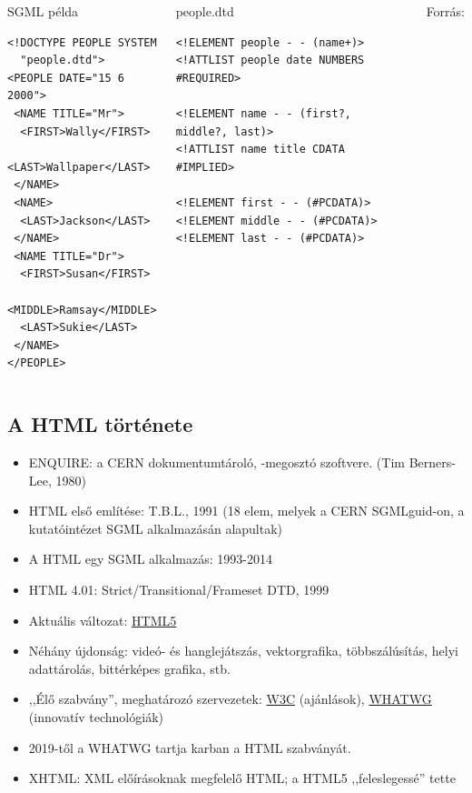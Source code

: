 \documentclass[usenames,dvipsnames,aspectratio=169]{beamer}
\newcommand{\hiv}[1]{{\color{hivatkozasszin}#1}}
\begin{document}
\begin{frame}[fragile]
  \scriptsize
  \begin{columns}[T]
    \begin{exampleblock}{SGML példa}
      \begin{verbatim}
<!DOCTYPE PEOPLE SYSTEM 
  "people.dtd">
<PEOPLE DATE="15 6 2000">
 <NAME TITLE="Mr">
  <FIRST>Wally</FIRST>
  <LAST>Wallpaper</LAST>
 </NAME>
 <NAME>
  <LAST>Jackson</LAST>
 </NAME>
 <NAME TITLE="Dr">
  <FIRST>Susan</FIRST>
  <MIDDLE>Ramsay</MIDDLE>
  <LAST>Sukie</LAST>
 </NAME>
</PEOPLE>
\end{verbatim}
    \end{exampleblock}
    \begin{exampleblock}{people.dtd}
      \begin{verbatim}
<!ELEMENT people - - (name+)>
<!ATTLIST people date NUMBERS #REQUIRED>

<!ELEMENT name - - (first?, middle?, last)>
<!ATTLIST name title CDATA #IMPLIED>

<!ELEMENT first - - (#PCDATA)>
<!ELEMENT middle - - (#PCDATA)>
<!ELEMENT last - - (#PCDATA)>
\end{verbatim}
    \end{exampleblock}
    \tiny
    Forrás: 
  \end{columns}
\end{frame}

\subsection{A HTML története}

\begin{frame}
  \begin{itemize}
    \item ENQUIRE: a CERN dokumentumtároló, -megosztó szoftvere. (Tim Berners-Lee, 1980)
    \item HTML első említése: T.B.L., 1991 (18 elem, melyek a CERN SGMLguid-on, a kutatóintézet SGML alkalmazásán alapultak)
    \item A HTML egy SGML alkalmazás: 1993-2014
    \item HTML 4.01: Strict/Transitional/Frameset DTD, 1999
    \item Aktuális változat: \hiv{\href{https://www.w3.org/TR/html52/}{HTML5}}
    \item Néhány újdonság: videó- és hanglejátszás, vektorgrafika, többszálúsítás, helyi adattárolás, bittérképes grafika, stb.
    \item ,,Élő szabvány'', meghatározó szervezetek: \hiv{\href{https://www.w3.org/}{W3C}} (ajánlások), \hiv{\href{https://whatwg.org/}{WHATWG}} (innovatív technológiák)
    \item 2019-től a WHATWG tartja karban a HTML szabványát.
    \item XHTML: XML előírásoknak megfelelő HTML; a HTML5 ,,feleslegessé'' tette
  \end{itemize}
\end{frame}
\end{document}
